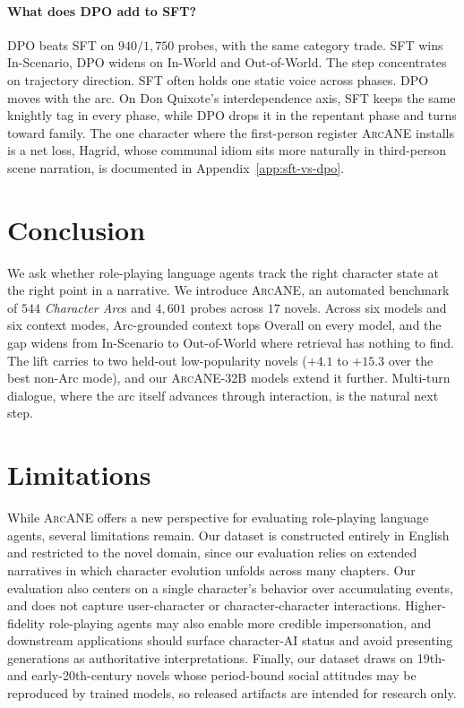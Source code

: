 \documentclass{llmxive}
\providecommand{\ours}{\textsc{ArcANE}}
\begin{document}
\paragraph{What does DPO add to SFT?}
\label{sec:compare_sft_dpo}
DPO beats SFT on $940/1{,}750$ probes, %
with the same category trade. SFT wins In-Scenario, DPO widens on In-World and Out-of-World. The step concentrates on trajectory direction. SFT often holds one static voice across phases. DPO moves with the arc. On Don Quixote's interdependence axis, SFT keeps the same knightly tag in every phase, while DPO drops it in the repentant phase and turns toward family. The one character where the first-person register \ours{} installs is a net loss, Hagrid, whose communal idiom sits more naturally in third-person scene narration, is documented in Appendix~\ref{app:sft-vs-dpo}.

\section{Conclusion\label{sec:conclusion}}
We ask whether role-playing language agents track the right character state at the right point in a narrative. We introduce \ours{}, an automated benchmark of $544$ \emph{Character Arc}s and $4{,}601$ probes across $17$ novels. %
Across six models and six context modes, Arc-grounded context tops Overall on every model, and the gap widens from In-Scenario to Out-of-World where retrieval has nothing to find. The lift carries to two held-out low-popularity novels ($+4.1$ to $+15.3$ over the best non-Arc mode), and our \ours{}-32B models extend it further. Multi-turn dialogue, where the arc itself advances through interaction, is the natural next step.
\section*{Limitations\label{sec:limitations}}
While \ours{} offers a new perspective for evaluating role-playing language agents, several limitations remain. Our dataset is constructed entirely in English and restricted to the novel domain, since our evaluation relies on extended narratives in which character evolution unfolds across many chapters. Our evaluation also centers on a single character's behavior over accumulating events, and does not capture user-character or character-character interactions. Higher-fidelity role-playing agents may also enable more credible impersonation, and downstream applications should surface character-AI status and avoid presenting generations as authoritative interpretations. Finally, our dataset draws on 19th- and early-20th-century novels whose period-bound social attitudes may be reproduced by trained models, so released artifacts are intended for research only.
\end{document}
